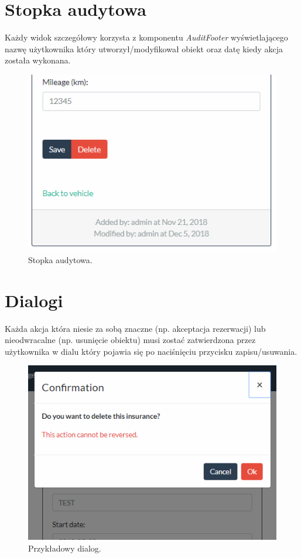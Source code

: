\documentclass[eng,printmode,openany]{mgr}
\begin{document}
	\newpage
	\section{Stopka audytowa}
	Każdy widok szczegółowy korzysta z komponentu \textit{AuditFooter} wyświetlającego nazwę użytkownika który utworzył/modyfikował obiekt oraz datę kiedy akcja została wykonana.
	
	\begin{figure}[H]
		\centering
		\includegraphics[scale=0.5]{images/insurance_footer.png}
		\caption{Stopka audytowa.}
	\end{figure}

	\section{Dialogi}
	Każda akcja która niesie za sobą znaczne (np. akceptacja rezerwacji) lub nieodwracalne (np. usunięcie obiektu) musi zostać zatwierdzona przez użytkownika w dialu który pojawia się po naciśnięciu przycisku zapisu/usuwania.
	
	\begin{figure}[H]
		\centering
		\includegraphics[scale=0.7]{images/insurance_confirmation.png}
		\caption{Przykładowy dialog.}
	\end{figure}
	
\end{document}
